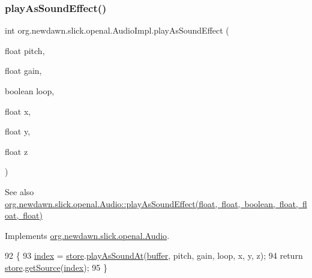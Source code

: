\subsubsection{\texorpdfstring{play\+As\+Sound\+Effect()}{playAsSoundEffect()}\hspace{0.1cm}{\footnotesize\ttfamily [2/2]}}
{\footnotesize\ttfamily int org.\+newdawn.\+slick.\+openal.\+Audio\+Impl.\+play\+As\+Sound\+Effect (\begin{DoxyParamCaption}\item[{float}]{pitch,  }\item[{float}]{gain,  }\item[{boolean}]{loop,  }\item[{float}]{x,  }\item[{float}]{y,  }\item[{float}]{z }\end{DoxyParamCaption})\hspace{0.3cm}{\ttfamily [inline]}}

\begin{DoxySeeAlso}{See also}
\mbox{\hyperlink{interfaceorg_1_1newdawn_1_1slick_1_1openal_1_1_audio_aebd22c97a1ed92528ad816e7152c7e00}{org.\+newdawn.\+slick.\+openal.\+Audio\+::play\+As\+Sound\+Effect(float, float, boolean, float, float, float)}} 
\end{DoxySeeAlso}


Implements \mbox{\hyperlink{interfaceorg_1_1newdawn_1_1slick_1_1openal_1_1_audio_aebd22c97a1ed92528ad816e7152c7e00}{org.\+newdawn.\+slick.\+openal.\+Audio}}.


\begin{DoxyCode}
92                                                                                                    \{
93         \mbox{\hyperlink{classorg_1_1newdawn_1_1slick_1_1openal_1_1_audio_impl_ab0e80c9c431d4b6c9b667012f7f71b86}{index}} = \mbox{\hyperlink{classorg_1_1newdawn_1_1slick_1_1openal_1_1_audio_impl_a1f616264ac2d6ec44cb0c187836d34f5}{store}}.\mbox{\hyperlink{classorg_1_1newdawn_1_1slick_1_1openal_1_1_sound_store_ac02e6575d7d04dbc045fe86bfaa506e3}{playAsSoundAt}}(\mbox{\hyperlink{classorg_1_1newdawn_1_1slick_1_1openal_1_1_audio_impl_ac08b49601da30895fecfdca4e8ba0049}{buffer}}, pitch, gain, loop, x, y, z);
94         \textcolor{keywordflow}{return} \mbox{\hyperlink{classorg_1_1newdawn_1_1slick_1_1openal_1_1_audio_impl_a1f616264ac2d6ec44cb0c187836d34f5}{store}}.\mbox{\hyperlink{classorg_1_1newdawn_1_1slick_1_1openal_1_1_sound_store_a36b83b67fccef1cd5167d2ea11e89f6a}{getSource}}(\mbox{\hyperlink{classorg_1_1newdawn_1_1slick_1_1openal_1_1_audio_impl_ab0e80c9c431d4b6c9b667012f7f71b86}{index}});
95     \}
\end{DoxyCode}
\mbox{\label{classorg_1_1newdawn_1_1slick_1_1openal_1_1_audio_impl_af97dda0973c05bd1db4867597410161a}} 
